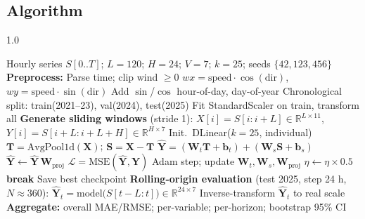 \documentclass[12pt,a4paper,oneside]{report}
\begin{document}
\subsection{Algorithm}

\begin{spacing}{1.0}
\begin{algorithm}[H]
\small
\caption{DLinear training and rolling-origin evaluation}
\label{alg:dlinear}
\begin{algorithmic}[1]
\Require Hourly series $S[0..T]$; $L=120$; $H=24$; $V=7$; $k=25$;
         seeds $\{42,123,456\}$
\State \textbf{Preprocess:}
\State \quad Parse time; clip wind $\ge 0$
\State \quad $wx = \text{speed}\cdot\cos(\text{dir})$,\;
        $wy = \text{speed}\cdot\sin(\text{dir})$
\State \quad Add $\sin$/$\cos$ hour-of-day, day-of-year
\State \quad Chronological split: train(2021--23), val(2024), test(2025)
\State \quad Fit StandardScaler on train, transform all
\State \textbf{Generate sliding windows} (stride 1):
\State \quad $X[i] = S[i:i+L] \in \mathbb{R}^{L \times 11}$,\;
        $Y[i] = S[i+L:i+L+H] \in \mathbb{R}^{H \times 7}$
  \State Init.\ DLinear($k=25$, individual)
    \State $\mathbf{T} = \text{AvgPool1d}(\mathbf{X})$;\;
          $\mathbf{S} = \mathbf{X} - \mathbf{T}$
    \State $\mathbf{\hat{Y}} = (\mathbf{W}_t\mathbf{T} + \mathbf{b}_t)
           + (\mathbf{W}_s\mathbf{S} + \mathbf{b}_s)$
    \State $\mathbf{\hat{Y}} \gets \mathbf{\hat{Y}}\,\mathbf{W}_{\text{proj}}$
    \State $\mathcal{L} = \text{MSE}(\mathbf{\hat{Y}}, \mathbf{Y})$
    \State Adam step; update $\mathbf{W}_t,\mathbf{W}_s,\mathbf{W}_{\text{proj}}$
     \State $\eta \gets \eta \times 0.5$ \EndIf
     \State \textbf{break} \EndIf
  \EndFor
  \State Save best checkpoint
\EndFor
\State \textbf{Rolling-origin evaluation} (test 2025, step 24 h, $N\approx 360$):
  \State $\mathbf{\hat{Y}}_t = \text{model}\big(S[t-L:t]\big)
         \in \mathbb{R}^{24 \times 7}$
  \State Inverse-transform $\mathbf{\hat{Y}}_t$ to real scale
\EndFor
\State \textbf{Aggregate:} overall MAE/RMSE; per-variable; per-horizon;
       bootstrap 95\% CI
\end{algorithmic}
\end{algorithm}
\end{spacing}
\end{document}
